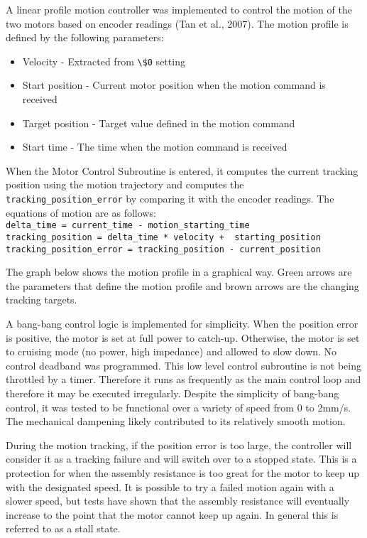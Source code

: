 A linear profile motion controller was implemented to control the motion of the two motors based on encoder readings (Tan et al., 2007). The motion profile is defined by the following parameters:
\begin{itemize}
    \item Velocity - Extracted from \verb|\$0| setting
    \item Start position - Current motor position when the motion command is received
    \item Target position - Target value defined in the motion command
    \item Start time - The time when the motion command is received
\end{itemize}

When the Motor Control Subroutine is entered, it computes the current tracking position using the motion trajectory and computes the \verb|tracking_position_error| by comparing it with the encoder readings. The equations of motion are as follows: \\
{
\scriptsize
\verb|delta_time = current_time - motion_starting_time|\\
\verb|tracking_position = delta_time * velocity +  starting_position|\\
\verb|tracking_position_error = tracking_position - current_position|\\
}

The graph below shows the motion profile in a graphical way. Green arrows are the parameters that define the motion profile and brown arrows are the changing tracking targets.

A bang-bang control logic is implemented for simplicity. When the position error is positive, the motor is set at full power to catch-up. Otherwise, the motor is set to cruising mode (no power, high impedance) and allowed to slow down. No control deadband was programmed. This low level control subroutine is not being throttled by a timer. Therefore it runs as frequently as the main control loop and therefore it may be executed irregularly. Despite the simplicity of bang-bang control, it was tested to be functional over a variety of speed from 0 to 2mm/s. The mechanical dampening likely contributed to its relatively smooth motion.

During the motion tracking, if the position error is too large, the controller will consider it as a tracking failure and will switch over to a stopped state. This is a protection for when the assembly resistance is too great for the motor to keep up with the designated speed. It is possible to try a failed motion again with a slower speed, but tests have shown that the assembly resistance will eventually increase to the point that the motor cannot keep up again. In general this is referred to as a stall state. 

